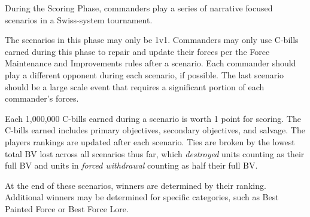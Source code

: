During the Scoring Phase, commanders play a series of narrative focused scenarios in a Swiss-system tournament.

The scenarios in this phase may only be 1v1.
Commanders may only use C-bills earned during this phase to repair and update their forces per the Force Maintenance and Improvements rules after a scenario.
Each commander should play a different opponent during each scenario, if possible.
The last scenario should be a large scale event that requires a significant portion of each commander's forces.

Each 1,000,000 C-bills earned during a scenario is worth 1 point for scoring.
The C-bills earned includes primary objectives, secondary objectives, and salvage.
The players rankings are updated after each scenario.
Ties are broken by the lowest total BV lost across all scenarios thus far, which \emph{destroyed} units counting as their full BV and units in \emph{forced withdrawal} counting as half their full BV.

At the end of these scenarios, winners are determined by their ranking.
Additional winners may be determined for specific categories, such as Best Painted Force or Best Force Lore.
